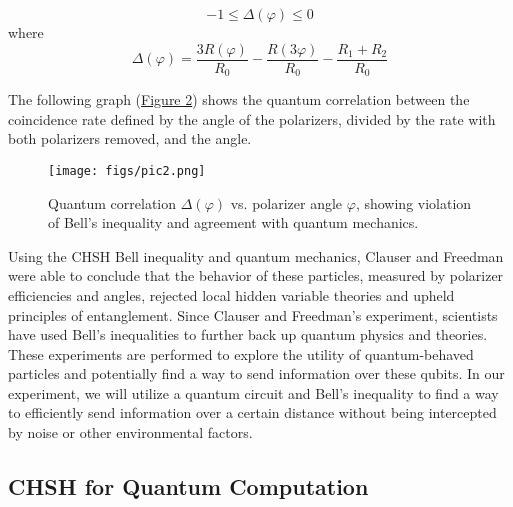 \documentclass[a4paper, onecolumn, 11pt, titlepage]{quantumarticle}
\begin{document}
$$-1 \leq \Delta(\varphi) \leq 0$$
where
$$\Delta(\varphi) = \frac{3R(\varphi)}{R_0} - \frac{R(3\varphi)}{R_0} - \frac{R_1+R_2}{R_0}$$

The following graph (\hyperref[fig:angles-graph]{Figure 2}) shows the quantum correlation between the coincidence rate defined by the angle of the polarizers, divided by the rate with both polarizers removed, and the angle. 

\begin{figure}
    \centering
    \texttt{[image: figs/pic2.png]}
    \caption{Quantum correlation $\Delta(\varphi)$ vs. polarizer angle $\varphi$, showing violation of Bell’s inequality and agreement with quantum mechanics.}
    \label{fig:angles-graph}
\end{figure}

Using the CHSH Bell inequality and quantum mechanics, Clauser and Freedman were able to conclude that the behavior of these particles, measured by polarizer efficiencies and angles, rejected local hidden variable theories and upheld principles of entanglement. 
Since Clauser and Freedman’s experiment, scientists have used Bell’s inequalities to further back up quantum physics and theories. These experiments are performed to explore the utility of quantum-behaved particles and potentially find a way to send information over these qubits. In our experiment, we will utilize a quantum circuit and Bell’s inequality to find a way to efficiently send information over a certain distance without being intercepted by noise or other environmental factors. 


\subsection{CHSH for Quantum Computation}

\end{document}

